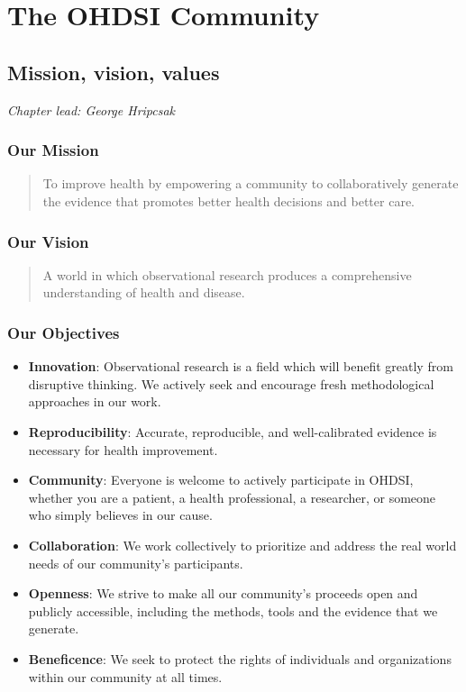 \documentclass[11pt]{book}
\begin{document}
\part{The OHDSI Community}\label{part-the-ohdsi-community}

\chapter{Mission, vision, values}\label{MissionVissionValues}

\emph{Chapter lead: George Hripcsak}

\section{Our Mission}\label{our-mission}

\begin{quote}
To improve health by empowering a community to collaboratively generate
the evidence that promotes better health decisions and better care.
\end{quote}

\section{Our Vision}\label{our-vision}

\begin{quote}
A world in which observational research produces a comprehensive
understanding of health and disease.
\end{quote}

\section{Our Objectives}\label{our-objectives}

\begin{itemize}
\item
  \textbf{Innovation}: Observational research is a field which will
  benefit greatly from disruptive thinking. We actively seek and
  encourage fresh methodological approaches in our work.
\item
  \textbf{Reproducibility}: Accurate, reproducible, and well-calibrated
  evidence is necessary for health improvement.
\item
  \textbf{Community}: Everyone is welcome to actively participate in
  OHDSI, whether you are a patient, a health professional, a researcher,
  or someone who simply believes in our cause.
\item
  \textbf{Collaboration}: We work collectively to prioritize and address
  the real world needs of our community's participants.
\item
  \textbf{Openness}: We strive to make all our community's proceeds open
  and publicly accessible, including the methods, tools and the evidence
  that we generate.
\item
  \textbf{Beneficence}: We seek to protect the rights of individuals and
  organizations within our community at all times.
\end{itemize}
\end{document}
